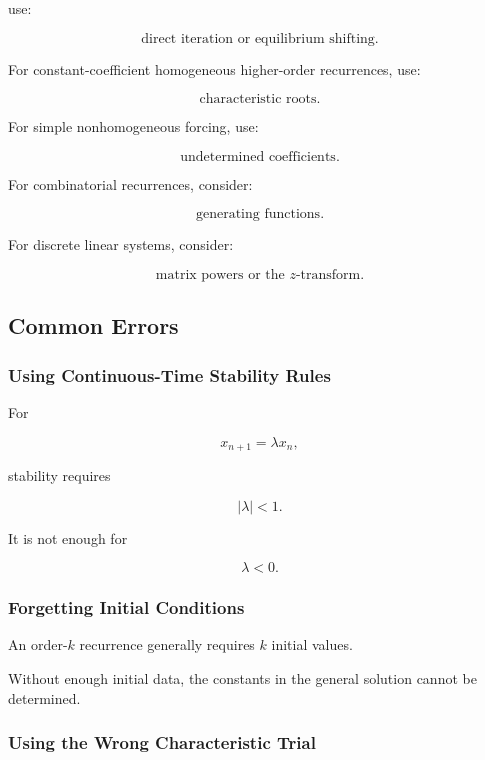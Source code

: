 use:

\[
\boxed{
\text{direct iteration or equilibrium shifting}.
}
\]

For constant-coefficient homogeneous higher-order recurrences, use:

\[
\boxed{
\text{characteristic roots}.
}
\]

For simple nonhomogeneous forcing, use:

\[
\boxed{
\text{undetermined coefficients}.
}
\]

For combinatorial recurrences, consider:

\[
\boxed{
\text{generating functions}.
}
\]

For discrete linear systems, consider:

\[
\boxed{
\text{matrix powers or the }z\text{-transform}.
}
\]

\subsection{Common Errors}
\label{subsec:difference-equation-common-errors}

\subsubsection{Using Continuous-Time Stability Rules}

For

\[
x_{n+1}=\lambda x_n,
\]

stability requires

\[
\boxed{
|\lambda|<1.
}
\]

It is not enough for

\[
\lambda<0.
\]

\subsubsection{Forgetting Initial Conditions}

An order-\(k\) recurrence generally requires \(k\) initial values.

Without enough initial data, the constants in the general solution cannot
be determined.

\subsubsection{Using the Wrong Characteristic Trial}

